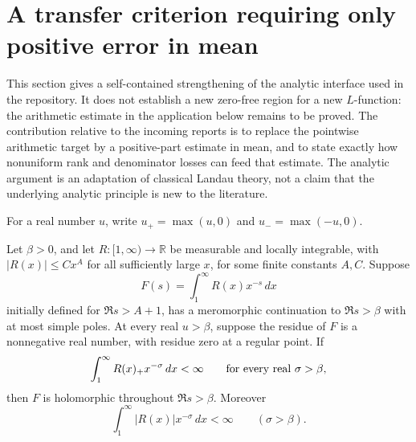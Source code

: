 \section{A transfer criterion requiring only positive error in mean}
\label{sec:mean-transfer}

This section gives a self-contained strengthening of the analytic interface used in
the repository.  It does not establish a new zero-free region for a new
$L$-function: the arithmetic estimate in the application below remains to be
proved.  The contribution relative to the incoming reports is to replace the
pointwise arithmetic target by a positive-part estimate in mean, and to state
exactly how nonuniform rank and denominator losses can feed that estimate.
The analytic argument is an adaptation of classical Landau theory, not a claim
that the underlying analytic principle is new to the literature.

For a real number $u$, write $u_+=\max(u,0)$ and $u_-=\max(-u,0)$.

\begin{theorem}\label{thm:positive-mellin}
Let $\beta>0$, and let $R:[1,\infty)\to\mathbb R$ be measurable and locally
integrable, with $|R(x)|\le Cx^A$ for all sufficiently large $x$, for some
finite constants $A,C$. Suppose
\[
 F(s)=\int_1^\infty R(x)x^{-s}\,dx
\]
initially defined for $\Re s>A+1$, has a meromorphic continuation to
$\Re s>\beta$ with at most simple poles.  At every real $u>\beta$, suppose
the residue of $F$ is a nonnegative real number, with residue zero at a
regular point.  If
\begin{equation}\label{eq:positive-integrability}
 \int_1^\infty R(x)_+x^{-\sigma}\,dx<\infty
 \qquad\hbox{for every real }\sigma>\beta,
\end{equation}
then $F$ is holomorphic throughout $\Re s>\beta$. Moreover
\[
 \int_1^\infty |R(x)|x^{-\sigma}\,dx<\infty
 \qquad(\sigma>\beta).
\]
\end{theorem}


